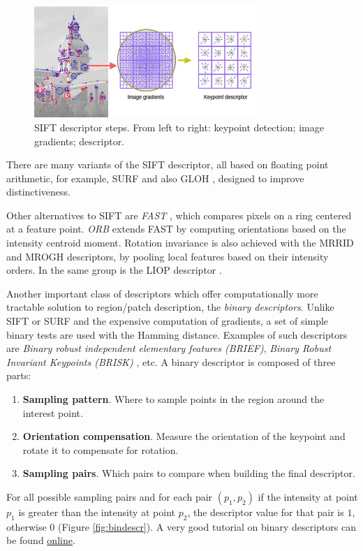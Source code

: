 \begin{figure}[H]
\begin{center}
\includegraphics[width=0.75\textwidth]{fig/SIFT}
\end{center}
\caption{SIFT descriptor steps. From left to right: keypoint detection; image gradients; descriptor.}
\label{fig:sift}
\end{figure}

There are many variants of the SIFT descriptor, all based on floating point arithmetic, for example, SURF\cite{Bay:2008:SURF} and also GLOH \cite{MS05}, designed to improve distinctiveness.

Other alternatives to SIFT are {\em FAST} \cite{Rosten:2006}, which compares pixels on a ring centered at a feature point. {\em  ORB} \cite{Rublee:2011} extends FAST by computing orientations based on the intensity centroid moment. Rotation invariance is also achieved with the MRRID and MROGH descriptors, \cite{journals:pami:FanWH12} by pooling local features based on their intensity orders. In the same group is the LIOP descriptor \cite{ZhenhuaWang:2011:LIO}. 

Another important class of descriptors which offer computationally more tractable solution to region/patch description, the {\em binary descriptors}. Unlike SIFT or SURF and the expensive computation of gradients, a set of simple binary tests are used with the Hamming distance. Examples of such descriptors are {\em Binary robust independent elementary features (BRIEF)}\cite{Calonder:2010}, {\em Binary Robust Invariant Keypoints (BRISK)} \cite{Leutenegger:2011}, etc. A binary descriptor is composed of three parts:
\begin{enumerate}
\item{\bf Sampling pattern}. Where to sample points in the region around the interest point.
\item{\bf Orientation compensation}. Measure the orientation of the keypoint and rotate it to compensate for rotation.
\item{\bf Sampling pairs}. Which pairs to compare when building the final descriptor.
\end{enumerate}
For all possible sampling pairs and for each pair $(p_1, p_2)$ if the intensity at point $p_1$ is greater than the intensity at point $p_2$, the descriptor value for that pair is $1$, otherwise $0$ (Figure \ref{fig:bindescr}). A very good tutorial on binary descriptors can be found \href{https://gilscvblog.wordpress.com/?s=descriptors}{online}. 

